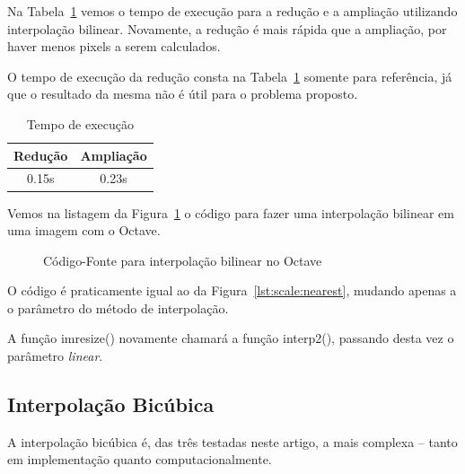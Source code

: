 \documentclass[12pt]{article}
\begin{document}
Na Tabela~\ref{tab:bilinear} vemos o tempo de execução para a redução e a ampliação utilizando interpolação bilinear. Novamente, a redução é mais rápida que a ampliação, por haver menos pixels a serem calculados.

O tempo de execução da redução consta na Tabela~\ref{tab:bilinear} somente para referência, já que o resultado da mesma não é útil para o problema proposto.

\begin{table}[H]
    \caption{Tempo de execução}
    \centering
    \label{tab:bilinear}
    \begin{tabular}{c||c}
     Redução & Ampliação \\
     \hline
     0.15s & 0.23s
    \end{tabular}
\end{table}

Vemos na listagem da Figura~\ref{lst:scale:linear} o código para fazer uma interpolação bilinear em uma imagem com o Octave.

\begin{figure}[H]

\caption{Código-Fonte para interpolação bilinear no Octave}
\label{lst:scale:linear}
\end{figure}

O código é praticamente igual ao da Figura~\ref{lst:scale:nearest}, mudando apenas a o parâmetro do método de interpolação.

A função \textsf{imresize()} novamente chamará a função \textsf{interp2()}, passando desta vez o parâmetro \emph{linear}.


\subsection{Interpolação Bicúbica}\label{sec:redimensionamento:bicubica}

A interpolação bicúbica é, das três testadas neste artigo, a mais complexa -- tanto em implementação quanto computacionalmente.~\cite{han2013}
\end{document}

